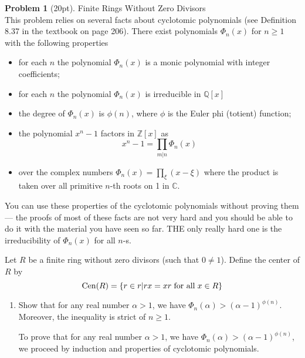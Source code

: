 \documentclass[12pt]{article}
\theoremstyle{definition}
\newtheorem{problem}{Problem}
\DeclareMathOperator{\Cen}{Cen}
\begin{document}
\begin{problem}[20pt] Finite Rings Without Zero Divisors\\
      This problem relies on several facts about cyclotomic polynomials (see Definition 8.37
      in the textbook on page 206). There exist polynomials $\Phi_n(x)$ for $n \geq 1$ with 
      the following properties
      \begin{itemize}
            \item for each $n$ the polynomial $\Phi_n(x)$ is a monic polynomial with integer coefficients;
            \item for each $n$ the polynomial $\Phi_n(x)$ is irreducible in $\mathbb{Q}[x]$ 
            \item the degree of $\Phi_n(x)$ is $\phi(n)$, where $\phi$ is the Euler phi (totient) function;
            \item the polynomial $x^n - 1$ factors in $\mathbb{Z}[x]$ as
                  \[
                        x^{n} - 1 = \prod_{m|n}\Phi_n(x)
                  \]
            \item over the complex numbers $\Phi_n(x) = \prod_\xi(x - \xi)$ where the product is taken over
                  all primitive $n$-th roots on 1 in $\mathbb{C}$.
      \end{itemize}
      You can use these properties of the cyclotomic polynomials without proving them --- the proofs of most
      of these facts are not very hard and you should be able to do it with the material you have seen so far.
      THE only really hard one is the irreducibility of $\Phi_n(x)$ for all $n$-s.

      Let $R$ be a finite ring without zero divisors (such that $0 \neq 1$). Define the center of $R$ by
      \[
            \Cen(R) = \{ r \in r | rx = xr \hspace{3px} \text{for all} \hspace{3px} x \in R \}
      \]
      \begin{enumerate}[label=\arabic*.]
            \item Show that for any real number $\alpha > 1$, we have $\Phi_n(\alpha) > (\alpha - 1)^{\phi(n)}$.
                  Moreover, the inequality is strict of $n \geq 1$.

            \begin{solution}
                  To prove that for any real number $\alpha > 1$, we have $\Phi_n(\alpha) > (\alpha - 1)^{\phi(n)}$, we proceed by induction and properties of cyclotomic polynomials.


\end{solution}
\end{enumerate}
\end{problem}
\end{document}
